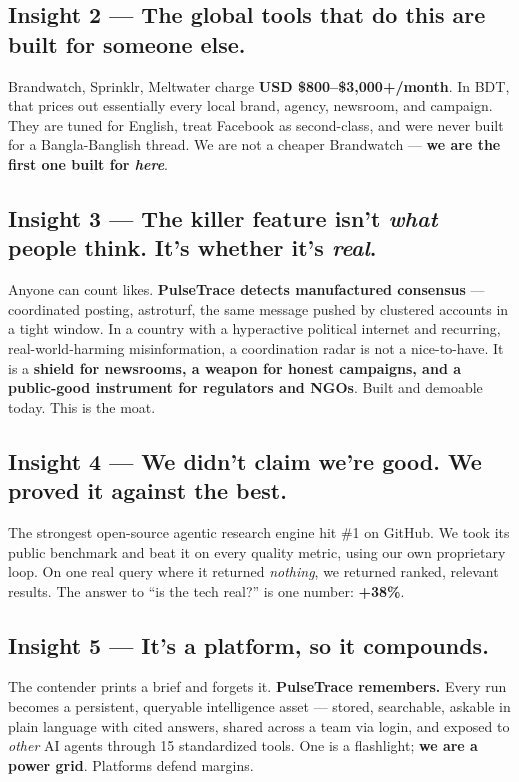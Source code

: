 \documentclass[11pt]{article}
\begin{document}
\subsection{Insight 2 — The global tools that do this are built for someone else.}
Brandwatch, Sprinklr, Meltwater charge \textbf{USD \$800--\$3{,}000+/month}. In BDT, that
prices out essentially every local brand, agency, newsroom, and campaign. They are tuned for
English, treat Facebook as second-class, and were never built for a Bangla-Banglish thread. We
are not a cheaper Brandwatch — \textbf{we are the first one built for \emph{here}}.

\subsection{Insight 3 — The killer feature isn't \emph{what} people think. It's whether it's \emph{real}.}
Anyone can count likes. \textbf{PulseTrace detects manufactured consensus} — coordinated
posting, astroturf, the same message pushed by clustered accounts in a tight window. In a
country with a hyperactive political internet and recurring, real-world-harming misinformation,
a coordination radar is not a nice-to-have. It is a \textbf{shield for newsrooms, a weapon for
honest campaigns, and a public-good instrument for regulators and NGOs}. Built and demoable
today. This is the moat.

\subsection{Insight 4 — We didn't claim we're good. We proved it against the best.}
The strongest open-source agentic research engine hit \#1 on GitHub. We took its public
benchmark and beat it on every quality metric, using our own proprietary loop. On one real
query where it returned \emph{nothing}, we returned ranked, relevant results. The answer to
``is the tech real?'' is one number: \textbf{+38\%}.

\subsection{Insight 5 — It's a platform, so it compounds.}
The contender prints a brief and forgets it. \textbf{PulseTrace remembers.} Every run becomes a
persistent, queryable intelligence asset — stored, searchable, askable in plain language with
cited answers, shared across a team via login, and exposed to \emph{other} AI agents through 15
standardized tools. One is a flashlight; \textbf{we are a power grid}. Platforms defend margins.
\end{document}
